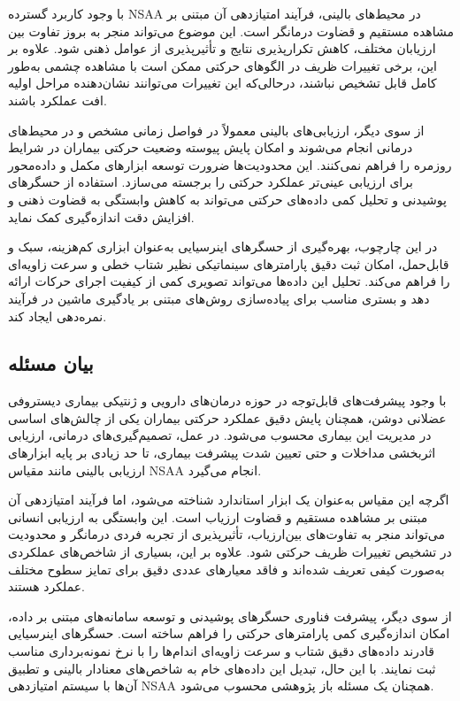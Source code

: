 با وجود کاربرد گسترده NSAA در محیط‌های بالینی، فرآیند امتیازدهی آن مبتنی بر مشاهده مستقیم و قضاوت درمانگر است. این موضوع می‌تواند منجر به بروز تفاوت بین ارزیابان مختلف، کاهش تکرارپذیری نتایج و تأثیرپذیری از عوامل ذهنی شود. علاوه بر این، برخی تغییرات ظریف در الگوهای حرکتی ممکن است با مشاهده چشمی به‌طور کامل قابل تشخیص نباشند، درحالی‌که این تغییرات می‌توانند نشان‌دهنده مراحل اولیه افت عملکرد باشند.

از سوی دیگر، ارزیابی‌های بالینی معمولاً در فواصل زمانی مشخص و در محیط‌های درمانی انجام می‌شوند و امکان پایش پیوسته وضعیت حرکتی بیماران در شرایط روزمره را فراهم نمی‌کنند. این محدودیت‌ها ضرورت توسعه ابزارهای مکمل و داده‌محور برای ارزیابی عینی‌تر عملکرد حرکتی را برجسته می‌سازد. استفاده از حسگرهای پوشیدنی و تحلیل کمی داده‌های حرکتی می‌تواند به کاهش وابستگی به قضاوت ذهنی و افزایش دقت اندازه‌گیری کمک نماید.

در این چارچوب، بهره‌گیری از حسگرهای اینرسیایی به‌عنوان ابزاری کم‌هزینه، سبک و قابل‌حمل، امکان ثبت دقیق پارامترهای سینماتیکی نظیر شتاب خطی و سرعت زاویه‌ای را فراهم می‌کند. تحلیل این داده‌ها می‌تواند تصویری کمی از کیفیت اجرای حرکات ارائه دهد و بستری مناسب برای پیاده‌سازی روش‌های مبتنی بر یادگیری ماشین در فرآیند نمره‌دهی ایجاد کند.

\subsection{بیان مسئله}

با وجود پیشرفت‌های قابل‌توجه در حوزه درمان‌های دارویی و ژنتیکی بیماری دیستروفی عضلانی دوشن، همچنان پایش دقیق عملکرد حرکتی بیماران یکی از چالش‌های اساسی در مدیریت این بیماری محسوب می‌شود. در عمل، تصمیم‌گیری‌های درمانی، ارزیابی اثربخشی مداخلات و حتی تعیین شدت پیشرفت بیماری، تا حد زیادی بر پایه ابزارهای ارزیابی بالینی مانند مقیاس NSAA انجام می‌گیرد.

اگرچه این مقیاس به‌عنوان یک ابزار استاندارد شناخته می‌شود، اما فرآیند امتیازدهی آن مبتنی بر مشاهده مستقیم و قضاوت ارزیاب است. این وابستگی به ارزیابی انسانی می‌تواند منجر به تفاوت‌های بین‌ارزیاب، تأثیرپذیری از تجربه فردی درمانگر و محدودیت در تشخیص تغییرات ظریف حرکتی شود. علاوه بر این، بسیاری از شاخص‌های عملکردی به‌صورت کیفی تعریف شده‌اند و فاقد معیارهای عددی دقیق برای تمایز سطوح مختلف عملکرد هستند.

از سوی دیگر، پیشرفت فناوری حسگرهای پوشیدنی و توسعه سامانه‌های مبتنی بر داده، امکان اندازه‌گیری کمی پارامترهای حرکتی را فراهم ساخته است. حسگرهای اینرسیایی قادرند داده‌های دقیق شتاب و سرعت زاویه‌ای اندام‌ها را با نرخ نمونه‌برداری مناسب ثبت نمایند. با این حال، تبدیل این داده‌های خام به شاخص‌های معنادار بالینی و تطبیق آن‌ها با سیستم امتیازدهی NSAA همچنان یک مسئله باز پژوهشی محسوب می‌شود.

